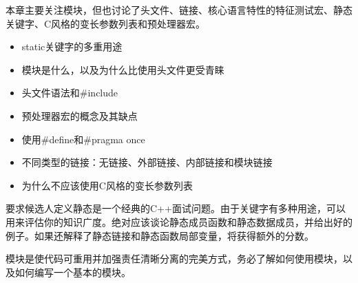 
本章主要关注模块，但也讨论了头文件、链接、核心语言特性的特征测试宏、静态关键字、C风格的变长参数列表和预处理器宏。


\begin{itemize}
\item
static关键字的多重用途

\item
模块是什么，以及为什么比使用头文件更受青睐

\item
头文件语法和\#include

\item
预处理器宏的概念及其缺点

\item
使用\#define和\#pragma once

\item
不同类型的链接：无链接、外部链接、内部链接和模块链接

\item
为什么不应该使用C风格的变长参数列表
\end{itemize}


要求候选人定义静态是一个经典的C++面试问题。由于关键字有多种用途，可以用来评估你的知识广度。绝对应该谈论静态成员函数和静态数据成员，并给出好的例子。如果还解释了静态链接和静态函数局部变量，将获得额外的分数。

模块是使代码可重用并加强责任清晰分离的完美方式，务必了解如何使用模块，以及如何编写一个基本的模块。








